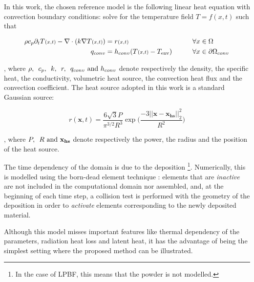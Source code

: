 In this work, the chosen reference model is
the following linear heat equation with convection
boundary conditions: solve for the temperature
field $T = f(x,t)$ such that

\begin{align}
  \rho c_p \partial_t T{\scriptstyle(x,t)} - \nabla \cdot (k \nabla T{\scriptstyle(x,t)}) &= r{\scriptstyle(x,t)}
  \qquad &\forall x &\in \Omega \label{eq:refheateq}\\
  q_{conv} &= h_{conv} ( T{\scriptstyle(x,t)} - T_{\textrm{env}} ) \qquad & \forall x &\in \partial \Omega {}_{conv}\notag
\end{align}

, where $\rho, \enskip c_p, \enskip k, \enskip  r, \enskip q_{conv} \textrm{ and } h_{conv}$
denote respectively
the density, the specific heat, the conductivity, volumetric
heat source, the convection heat flux and the convection coefficient.
The heat source adopted in this work is a standard Gaussian source:

\begin{equation}\label{eq:heatsource}
  r{\scriptstyle(\mathbf{x}, t)} = \frac{6 \sqrt{3} P}{ \pi^{3/2} R^3}
  \exp\bigg( \frac{-3||\mathbf{x} - \mathbf{x_{hs}}||_2^2}{R^2}\bigg)
\end{equation}

, where $P, \enskip R \textrm{ and } \mathbf{x_{hs}}$
denote respectively the power, the radius and the position
of the heat source.\par

The time dependency of the domain is due to
the deposition
\footnote{ In the case of LPBF, this means that the powder is not modelled. }.
Numerically, this is modelled using  the born-dead element
technique \citep{Chiumenti2010}:
elements that are \textit{inactive} are not included in the
computational domain nor assembled,
and, at the beginning of each time step, a collision test
is performed with the geometry of the deposition
in order to \textit{activate} elements corresponding to
the newly deposited material.\par

Although this model misses important features like
thermal dependency of the parameters, radiation heat loss and
latent heat\citep{VanElsen2007, Hodge2021},
it has the advantage of being the simplest setting
where the proposed method can be illustrated.\par
